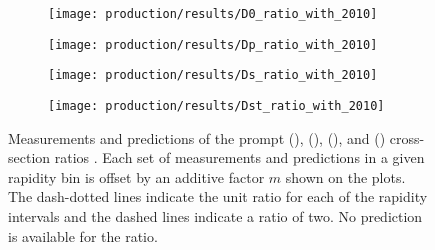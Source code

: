 \begin{figure}
  \begin{subfigure}[b]{0.5\textwidth}
    \centering
    \texttt{[image: production/results/D0\_ratio\_with\_2010]}
    \caption{\PDzero}
    \label{fig:prod:results:ratio_7tev:D0}
  \end{subfigure}
  \begin{subfigure}[b]{0.5\textwidth}
    \centering
    \texttt{[image: production/results/Dp\_ratio\_with\_2010]}
    \caption{\PDplus}
    \label{fig:prod:results:ratio_7tev:Dp}
  \end{subfigure}
  \begin{subfigure}[b]{0.5\textwidth}
    \centering
    \texttt{[image: production/results/Ds\_ratio\_with\_2010]}
    \caption{\PDsplus}
    \label{fig:prod:results:ratio_7tev:Ds}
  \end{subfigure}
  \begin{subfigure}[b]{0.5\textwidth}
    \centering
    \texttt{[image: production/results/Dst\_ratio\_with\_2010]}
    \caption{\PDstarp}
    \label{fig:prod:results:ratio_7tev:Dst}
  \end{subfigure}
  \caption{%
    Measurements and predictions of the prompt \PDzero
    (), \PDplus
    (), \PDsplus
    (), and \PDstarp
    () cross-section ratios
    .
    Each set of measurements and predictions in a given rapidity bin is offset
    by an additive factor $m$ shown on the plots.
    The dash-dotted lines indicate the unit ratio for each of the rapidity
    intervals and the dashed lines indicate a ratio of two.
    No prediction is available for the \PDsplus ratio.
  }
  \label{fig:prod:results:ratio_7tev}
\end{figure}

